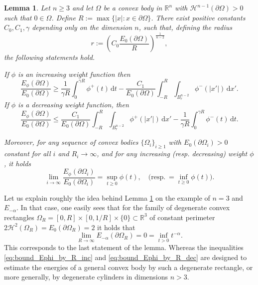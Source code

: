 \documentclass[10pt,leqno]{amsart}
\newcommand{\R}[0]{\mathbb{R}}
\newcommand{\p}{\partial}
\newcommand{\dd}{\, \mathrm{d}}
\numberwithin{Theorem}{section}
\newtheorem{Lemma}[Theorem]{Lemma}
\theoremstyle{definition}
\theoremstyle{remark}
\numberwithin{equation}{section}
\numberwithin{equation}{section}
\begin{document}
\begin{Lemma} \label{lm:bound_on_max_radius_decreasing}
    Let $n\geq 3$ and let $\Omega$ be a convex body in $\mathbb{R}^n$ with $\mathcal{H}^{n-1}(\p \Omega) >0$ such that $0 \in {\Omega}$. Define $R:=\max \{|x| : x \in \p \Omega\}$. There exist positive constants $C_0, C_1, \gamma$ depending only on the dimension $n$, such that, defining the radius
    \begin{equation} \label{eq:def_radius_r}
        r := \left( C_0 \frac{E_0(\p \Omega)}{R} \right)^{\frac{1}{n-2}},
    \end{equation}
    the following statements hold.
    
  If $\phi$ is an increasing weight function  then 
    \begin{equation}\label{eq:bound_Ephi_by_R_inc}
        \frac{E_{\phi}(\p \Omega)}{E_0(\p \Omega)} \geq \frac{1}{\gamma R} \int_0^{\gamma R} \phi^+(t) \dd t -  \frac{C_1}{E_0(\p \Omega)} \int_{-R}^R \int_{B^{n-2}_{r}} \phi^-(|x'|) \dd x'.
    \end{equation}
If $\phi$ is a decreasing weight function, then 
    \begin{equation}\label{eq:bound_Ephi_by_R_dec}
      \frac{E_{\phi}(\p \Omega)}{E_0(\p \Omega)} \leq \frac{C_1}{E_{0}(\p \Omega)} \int_{-R}^R \int_{B^{n-2}_{r}} \phi^+(|x'|) \dd x' - \frac{1}{\gamma R} \int_0^{\gamma R} \phi^-(t) \dd t.
    \end{equation}
    
    Moreover, for any sequence of convex bodies $\{\Omega_i\}_{i\geq 1}$ with $E_0(\p \Omega_i)>0$ constant for all $i$ and $R_i \to \infty$, and for any increasing (resp. decreasing) weight $\phi$, it holds
    $$\lim_{i \to \infty} \frac{E_\phi( \p \Omega_i)}{E_0(\p \Omega_i)} = \sup_{t\geq 0} \phi(t), \quad \text{(resp.} \ =\inf_{t\geq 0} \phi(t)).$$
\end{Lemma}

Let us explain roughly the idea behind Lemma \ref{lm:bound_on_max_radius_decreasing} on the example of $n=3$ and $E_{-\alpha}.$ In that case, one easily sees that for the family of degenerate convex rectangles $\Omega_R=[0,R]\times[0,1/R]\times\{0\}\subset\R^3$ of constant perimeter $2\mathcal{H}^{2}( \Omega_R)=E_0(\p\Omega_R)=2$ it holds that
$$
  \lim_{R\to\infty}E_{-\alpha}(\p \Omega_R)=0=\inf_{t>0}t^{-\alpha}.
$$
This corresponds to the last statement of the lemma. Whereas the inequalities \eqref{eq:bound_Ephi_by_R_inc} and \eqref{eq:bound_Ephi_by_R_dec} are designed to estimate the energies of a general convex body by such a degenerate  rectangle, or more generally, by degenerate cylinders in dimensions $n>3$. 
\end{document}
